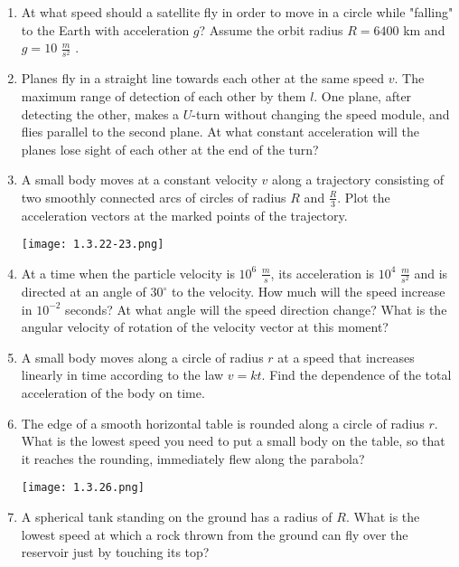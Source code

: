 \documentclass{article}
\begin{document}
\begin{enumerate}[label=1.3.\arabic*]
\item At what speed should a satellite fly in order to move in a circle while "falling" to the Earth with acceleration $g$? Assume the orbit radius $R = 6400$ km and $g = 10$ $\frac{m}{s^2}$ .

\item Planes fly in a straight line towards each other at the same speed $v$. The maximum range of detection of each other by them $l$. One plane, after detecting the other, makes a $U$-turn without changing the speed module, and flies parallel to the second plane. At what constant acceleration will the planes lose sight of each other at the end of the turn?

\item A small body moves at a constant velocity $v$ along a trajectory consisting of two smoothly connected arcs of circles of radius $R$ and $\frac{R}{3}$. Plot the acceleration vectors at the marked points of the trajectory.

\begin{center}
    \texttt{[image: 1.3.22-23.png]}
\end{center}

\item At a time when the particle velocity is $10^6$ $\frac{m}{s}$, its acceleration is $10^4$ $\frac{m}{s^2}$ and is directed at an angle of $30^\circ$ to the velocity. How much will the speed increase in $10^{-2}$ seconds? At what angle will the speed direction change? What is the angular velocity of rotation of the velocity vector at this moment?

\item A small body moves along a circle of radius $r$ at a speed that increases linearly in time according to the law $v = kt$. Find the dependence of the total acceleration of the body on time.

\item The edge of a smooth horizontal table is rounded along a circle of radius $r$. What is the lowest speed you need to put a small body on the table, so that it reaches the rounding, immediately flew along the parabola?

\begin{center}
    \texttt{[image: 1.3.26.png]}
\end{center}

\item A spherical tank standing on the ground has a radius of $R$. What is the lowest speed at which a rock thrown from the ground can fly over the reservoir just by touching its top?


\end{enumerate}
\end{document}
